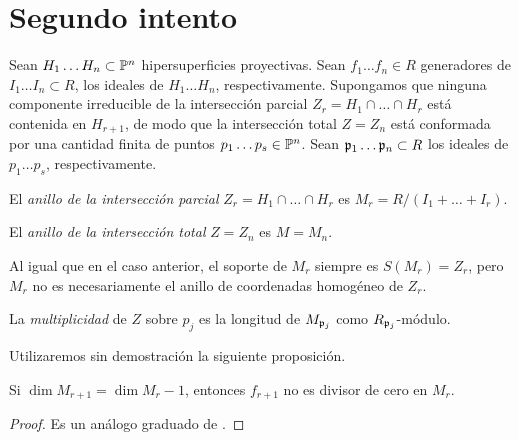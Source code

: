 \section{Segundo intento}

\begin{preliminaries}
Sean $H_1 \dots H_n \subset \P^n$ hipersuperficies proyectivas. Sean $f_1 \dots f_n \in R$ generadores de $I_1 \dots I_n \subset R$, los ideales de $H_1 \dots H_n$, respectivamente. Supongamos que ninguna componente irreducible de la intersección parcial $Z_r = H_1 \cap \dots \cap H_r$ está contenida en $H_{r+1}$, de modo que la intersección total $Z = Z_n$ está conformada por una cantidad finita de puntos $p_1 \dots p_s \in \P^n$. Sean $\p_1 \dots \p_n \subset R$ los ideales de $p_1 \dots p_s$, respectivamente.
\end{preliminaries}

\begin{definition}
El \textit{anillo de la intersección parcial} $Z_r = H_1 \cap \dots \cap H_r$ es $M_r = R / (I_1 + \dots + I_r)$.
\end{definition}

\begin{definition}
El \textit{anillo de la intersección total} $Z = Z_n$ es $M = M_n$.
\end{definition}

\begin{remark}
Al igual que en el caso anterior, el soporte de $M_r$ siempre es $S(M_r) = Z_r$, pero $M_r$ no es necesariamente el anillo de coordenadas homogéneo de $Z_r$.
\end{remark}

\begin{definition}
La \textit{multiplicidad} de $Z$ sobre $p_j$ es la longitud de $M_{\p_j}$ como $R_{\p_j}$-módulo.
\end{definition}

\begin{remark}
Utilizaremos sin demostración la siguiente proposición.
\end{remark}

\begin{proposition}
Si $\dim M_{r+1} = \dim M_r - 1$, entonces $f_{r+1}$ no es divisor de cero en $M_r$.
\end{proposition}

\begin{proof}
Es un análogo graduado de \cite[\href{https://stacks.math.columbia.edu/tag/00N6}{Tag 00N6}]{stacks}.
\end{proof}


